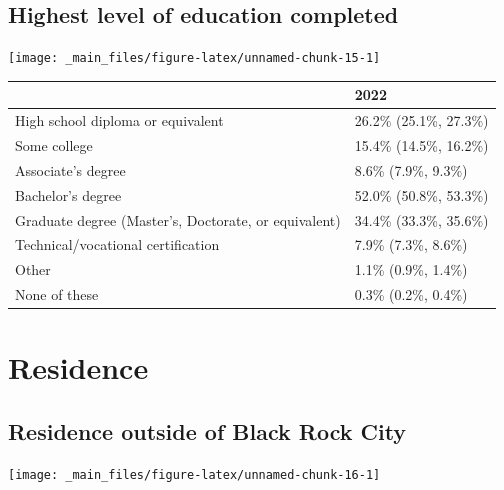 \documentclass[
]{book}
\begin{document}
\hypertarget{highest-level-of-education-completed}{%
\subsection{Highest level of education completed}\label{highest-level-of-education-completed}}

\texttt{[image: \_main\_files/figure-latex/unnamed-chunk-15-1]}

\begin{table}
\centering
\begin{tabular}[t]{>{}l|l}
\hline
  & 2022\\
\hline
High school diploma 
 or equivalent & 26.2\% (25.1\%, 27.3\%)\\
\hline
Some college & 15.4\% (14.5\%, 16.2\%)\\
\hline
Associate's degree & 8.6\% (7.9\%, 9.3\%)\\
\hline
Bachelor's degree & 52.0\% (50.8\%, 53.3\%)\\
\hline
Graduate degree (Master's, 
 Doctorate, or equivalent) & 34.4\% (33.3\%, 35.6\%)\\
\hline
Technical/vocational 
 certification & 7.9\% (7.3\%, 8.6\%)\\
\hline
Other & 1.1\% (0.9\%, 1.4\%)\\
\hline
None of these & 0.3\% (0.2\%, 0.4\%)\\
\hline
\end{tabular}
\end{table}

\hypertarget{residence}{%
\section{Residence}\label{residence}}

\hypertarget{residence-outside-of-black-rock-city}{%
\subsection{Residence outside of Black Rock City}\label{residence-outside-of-black-rock-city}}

\texttt{[image: \_main\_files/figure-latex/unnamed-chunk-16-1]}
\end{document}
